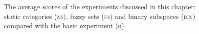 \begin{figure}
\caption{The average scores of the experiments discussed in this chapter: static categories (\textsc{ns}), fuzzy sets (\textsc{fs}) and binary subspaces (\textsc{bin}) compared with the basic experiment (\textsc{b}).}
\label{f:par:cat}
\end{figure}

